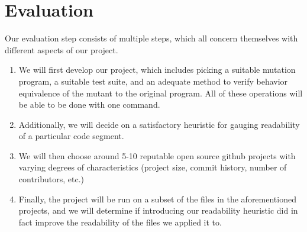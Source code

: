 \documentclass{article}
\begin{document}
\section{Evaluation}
Our evaluation step consists of multiple steps, which all concern themselves with different aspects of our project.
\begin{enumerate}
    \item We will first develop our project, which includes picking a suitable mutation program, a suitable test suite, and an adequate method to verify behavior equivalence of the mutant to the original program. All of these operations will be able to be done with one command.
    \item  Additionally, we will decide on a satisfactory heuristic for gauging readability of a particular code segment.
    \item We will then choose around 5-10 reputable open source github projects with varying degrees of characteristics (project size, commit history, number of contributors, etc.)
    \item Finally, the project will be run on a subset of the files in the aforementioned projects, and we will determine if introducing our readability heuristic did in fact improve the readability of the files we applied it to.
\end{enumerate}
\end{document}
